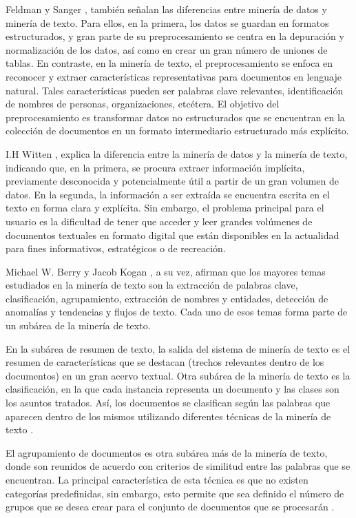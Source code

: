 Feldman y Sanger  \cite{feldman2007text}, también señalan las diferencias entre minería de datos y minería de texto.
Para ellos, en la primera, los datos se guardan en formatos estructurados, y gran parte de su preprocesamiento
se centra en la depuración y normalización de los datos, así como en crear un gran número de uniones de tablas. 
En contraste, en la minería de texto, el preprocesamiento se enfoca en reconocer y extraer características 
representativas para documentos en lenguaje natural. Tales características pueden ser palabras clave relevantes, 
identificación de nombres de personas, organizaciones, etcétera. El objetivo del preprocesamiento es transformar 
datos no estructurados que se encuentran en la colección de 
documentos en un formato intermediario estructurado más explícito.

I.H Witten \cite{witten2016data}, explica la diferencia entre la minería de datos y la minería de texto,
indicando que, en la primera, se procura extraer información implícita, previamente desconocida y
potencialmente útil a partir de un gran volumen de datos. En la segunda, la información a ser extraída
se encuentra escrita en el texto en forma clara y explícita. Sin embargo, el problema principal para el usuario
es la dificultad de tener que acceder y leer grandes volúmenes de documentos textuales en formato digital que están disponibles
en la actualidad para fines informativos, estratégicos o de recreación.

Michael W. Berry y Jacob Kogan \cite{berry2010text}, a su vez, afirman que los mayores temas estudiados en la minería de texto
son la extracción de palabras clave, clasificación, agrupamiento, extracción de nombres y entidades, detección de anomalías y 
tendencias y flujos de texto. Cada uno de esos temas forma parte de un subárea de la minería de texto.

En la subárea de resumen de texto, la salida del sistema de minería de texto es el resumen de características que
se destacan (trechos relevantes dentro de los documentos) en un gran acervo textual. Otra subárea de la minería de
texto es la clasificación, en la que cada instancia representa un documento y las clases son los asuntos tratados.
Así, los documentos se clasifican según las palabras que aparecen dentro de los mismos utilizando diferentes técnicas 
de la minería de texto \cite{witten2016data}.

El agrupamiento de documentos es otra subárea más de la minería de texto, donde son reunidos de acuerdo con 
criterios de similitud entre las palabras que se encuentran. La principal característica de esta técnica es que
no existen categorías predefinidas, sin embargo, esto permite que sea definido el número de grupos que se desea
crear para el conjunto de documentos que se procesarán \cite{viera2017tecnicas}.

